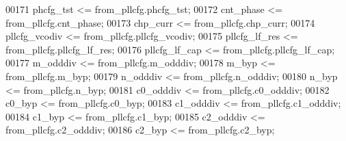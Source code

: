 \begin{DoxyCode}
00171 \textcolor{vhdlchar}{phcfg_tst}               \textcolor{vhdlchar}{<=} \textcolor{vhdlchar}{from_pllcfg}\textcolor{vhdlchar}{.}\textcolor{vhdlchar}{phcfg_tst};
00172 \textcolor{vhdlchar}{cnt_phase}               \textcolor{vhdlchar}{<=} \textcolor{vhdlchar}{from_pllcfg}\textcolor{vhdlchar}{.}\textcolor{vhdlchar}{cnt_phase};    
00173 \textcolor{vhdlchar}{chp_curr}                \textcolor{vhdlchar}{<=} \textcolor{vhdlchar}{from_pllcfg}\textcolor{vhdlchar}{.}\textcolor{vhdlchar}{chp_curr};
00174 \textcolor{vhdlchar}{pllcfg_vcodiv}           \textcolor{vhdlchar}{<=} \textcolor{vhdlchar}{from_pllcfg}\textcolor{vhdlchar}{.}\textcolor{vhdlchar}{pllcfg_vcodiv};
00175 \textcolor{vhdlchar}{pllcfg_lf_res}           \textcolor{vhdlchar}{<=} \textcolor{vhdlchar}{from_pllcfg}\textcolor{vhdlchar}{.}\textcolor{vhdlchar}{pllcfg_lf_res};
00176 \textcolor{vhdlchar}{pllcfg_lf_cap}           \textcolor{vhdlchar}{<=}  \textcolor{vhdlchar}{from_pllcfg}\textcolor{vhdlchar}{.}\textcolor{vhdlchar}{pllcfg_lf_cap};
00177 \textcolor{vhdlchar}{m_odddiv}                \textcolor{vhdlchar}{<=} \textcolor{vhdlchar}{from_pllcfg}\textcolor{vhdlchar}{.}\textcolor{vhdlchar}{m_odddiv};
00178 \textcolor{vhdlchar}{m_byp}                   \textcolor{vhdlchar}{<=} \textcolor{vhdlchar}{from_pllcfg}\textcolor{vhdlchar}{.}\textcolor{vhdlchar}{m_byp};
00179 \textcolor{vhdlchar}{n_odddiv}                \textcolor{vhdlchar}{<=} \textcolor{vhdlchar}{from_pllcfg}\textcolor{vhdlchar}{.}\textcolor{vhdlchar}{n_odddiv};
00180 \textcolor{vhdlchar}{n_byp}                   \textcolor{vhdlchar}{<=} \textcolor{vhdlchar}{from_pllcfg}\textcolor{vhdlchar}{.}\textcolor{vhdlchar}{n_byp};
00181 \textcolor{vhdlchar}{c0_odddiv}               \textcolor{vhdlchar}{<=} \textcolor{vhdlchar}{from_pllcfg}\textcolor{vhdlchar}{.}\textcolor{vhdlchar}{c0_odddiv};
00182 \textcolor{vhdlchar}{c0_byp}                  \textcolor{vhdlchar}{<=} \textcolor{vhdlchar}{from_pllcfg}\textcolor{vhdlchar}{.}\textcolor{vhdlchar}{c0_byp};
00183 \textcolor{vhdlchar}{c1_odddiv}               \textcolor{vhdlchar}{<=} \textcolor{vhdlchar}{from_pllcfg}\textcolor{vhdlchar}{.}\textcolor{vhdlchar}{c1_odddiv};
00184 \textcolor{vhdlchar}{c1_byp}                  \textcolor{vhdlchar}{<=} \textcolor{vhdlchar}{from_pllcfg}\textcolor{vhdlchar}{.}\textcolor{vhdlchar}{c1_byp};
00185 \textcolor{vhdlchar}{c2_odddiv}               \textcolor{vhdlchar}{<=} \textcolor{vhdlchar}{from_pllcfg}\textcolor{vhdlchar}{.}\textcolor{vhdlchar}{c2_odddiv};
00186 \textcolor{vhdlchar}{c2_byp}                  \textcolor{vhdlchar}{<=} \textcolor{vhdlchar}{from_pllcfg}\textcolor{vhdlchar}{.}\textcolor{vhdlchar}{c2_byp};

\end{DoxyCode}
